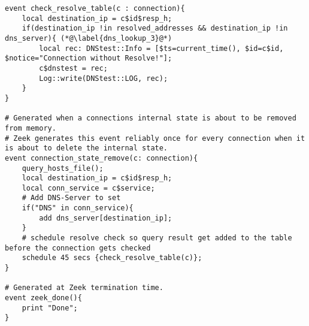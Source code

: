 \begin{lstlisting}[firstnumber=53,label={Code_5},linerange={53-64,65-73},caption={Überprüfung der Verbindungsziele eines Endgerätes},numberblanklines=false]
event check_resolve_table(c : connection){
    local destination_ip = c$id$resp_h;
    if(destination_ip !in resolved_addresses && destination_ip !in dns_server){ (*@\label{dns_lookup_3}@*)
        local rec: DNStest::Info = [$ts=current_time(), $id=c$id, $notice="Connection without Resolve!"];
        c$dnstest = rec;
        Log::write(DNStest::LOG, rec);
    }
}

# Generated when a connections internal state is about to be removed from memory.
# Zeek generates this event reliably once for every connection when it is about to delete the internal state.
event connection_state_remove(c: connection){
    query_hosts_file();
    local destination_ip = c$id$resp_h;
    local conn_service = c$service;
    # Add DNS-Server to set
    if("DNS" in conn_service){
        add dns_server[destination_ip];
    }
    # schedule resolve check so query result get added to the table before the connection gets checked 
    schedule 45 secs {check_resolve_table(c)}; 
}

# Generated at Zeek termination time.
event zeek_done(){
    print "Done";
}
\end{lstlisting}


